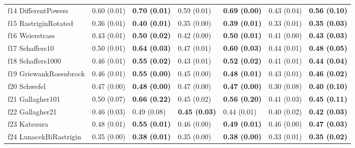 \begin{table}
\begin{tabular}{lllllll}
f14 DifferentPowers & 0.60 (0.01) & \textbf{0.70 (0.01)} & 0.59 (0.01) & \textbf{0.69 (0.00)} & 0.43 (0.04) & \textbf{0.56 (0.10)} \\
f15 RastriginRotated & 0.36 (0.01) & \textbf{0.40 (0.01)} & 0.35 (0.00) & \textbf{0.39 (0.01)} & 0.33 (0.01) & \textbf{0.35 (0.03)} \\
f16 Weierstrass & 0.43 (0.01) & \textbf{0.50 (0.02)} & 0.42 (0.00) & \textbf{0.50 (0.01)} & 0.41 (0.00) & \textbf{0.43 (0.03)} \\
f17 Schaffers10 & 0.50 (0.01) & \textbf{0.64 (0.03)} & 0.47 (0.01) & \textbf{0.60 (0.03)} & 0.44 (0.01) & \textbf{0.48 (0.05)} \\
f18 Schaffers1000 & 0.46 (0.01) & \textbf{0.55 (0.02)} & 0.43 (0.01) & \textbf{0.52 (0.02)} & 0.41 (0.01) & \textbf{0.44 (0.04)} \\
f19 GriewankRosenbrock & 0.46 (0.01) & \textbf{0.55 (0.00)} & 0.45 (0.00) & \textbf{0.48 (0.01)} & 0.43 (0.01) & \textbf{0.46 (0.02)} \\
f20 Schwefel & 0.47 (0.00) & \textbf{0.48 (0.00)} & 0.47 (0.00) & \textbf{0.47 (0.00)} & 0.30 (0.08) & \textbf{0.40 (0.10)} \\
f21 Gallagher101 & 0.50 (0.07) & \textbf{0.66 (0.22)} & 0.45 (0.02) & \textbf{0.56 (0.20)} & 0.41 (0.03) & \textbf{0.45 (0.11)} \\
f22 Gallagher21 & 0.46 (0.03) & 0.49 (0.08) & \textbf{0.45 (0.03)} & 0.44 (0.01) & 0.40 (0.02) & \textbf{0.42 (0.03)} \\
f23 Katsuura & 0.48 (0.01) & \textbf{0.55 (0.01)} & 0.46 (0.00) & \textbf{0.49 (0.01)} & 0.46 (0.00) & \textbf{0.47 (0.03)} \\
f24 LunacekBiRastrigin & 0.35 (0.00) & \textbf{0.38 (0.01)} & 0.35 (0.00) & \textbf{0.38 (0.00)} & 0.33 (0.01) & \textbf{0.35 (0.02)} \\
\bottomrule
\end{tabular}
\end{table}
